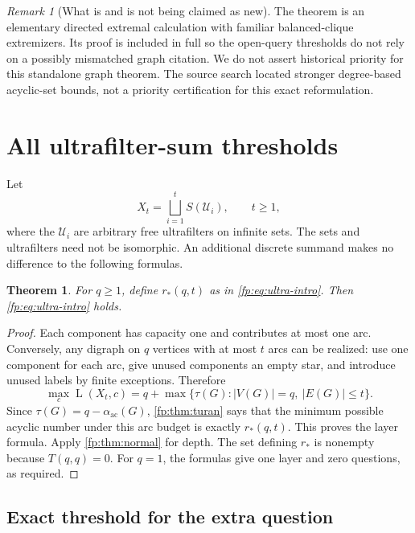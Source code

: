 \documentclass[11pt,letterpaper]{article}
\numberwithin{equation}{section}
\newtheorem{theorem}{Theorem}[section]
\theoremstyle{definition}
\theoremstyle{remark}
\newtheorem{remark}[remark]{Remark}
\theoremstyle{definition}
\newcommand{\layers}{\operatorname{L}}
\newcommand{\U}{\mathcal U}
\newcommand{\ac}{\alpha_{\mathrm{ac}}}
\begin{document}
\begin{remark}[What is and is not being claimed as new]
The theorem is an elementary directed extremal calculation with familiar
balanced-clique extremizers. Its proof is included in full so the
open-query thresholds do not rely on a possibly mismatched graph citation.
We do not assert historical priority for this standalone graph theorem.
The source search located stronger degree-based acyclic-set bounds, not a
priority certification for this exact reformulation.
\end{remark}

\section{All ultrafilter-sum thresholds}
\label{fp:sec:ultra}

Let
\[
 X_t=\bigsqcup_{i=1}^t S(\U_i),\qquad t\geq1,
\]
where the \(\U_i\) are arbitrary free ultrafilters on infinite sets.
The sets and ultrafilters need not be isomorphic. An additional discrete
summand makes no difference to the following formulas.

\begin{theorem}\label{fp:thm:ultra}
For \(q\geq1\), define \(r_*(q,t)\) as in \cref{fp:eq:ultra-intro}.
Then \cref{fp:eq:ultra-intro} holds.
\end{theorem}
\begin{proof}
Each component has capacity one and contributes at most one arc. Conversely,
any digraph on \(q\) vertices with at most \(t\) arcs can be realized:
use one component for each arc, give unused components an empty star,
and introduce unused labels by finite exceptions. Therefore
\[
 \max_c\layers(X_t,c)
 =q+\max\{\tau(G):|V(G)|=q,\ |E(G)|\leq t\}.
\]
Since \(\tau(G)=q-\ac(G)\), \cref{fp:thm:turan} says that the minimum
possible acyclic number under this arc budget is exactly \(r_*(q,t)\).
This proves the layer formula. Apply \cref{fp:thm:normal} for depth.
The set defining \(r_*\) is nonempty because \(T(q,q)=0\).
For \(q=1\), the formulas give one layer and zero questions, as required.
\end{proof}

\subsection{Exact threshold for the extra question}
\end{document}
